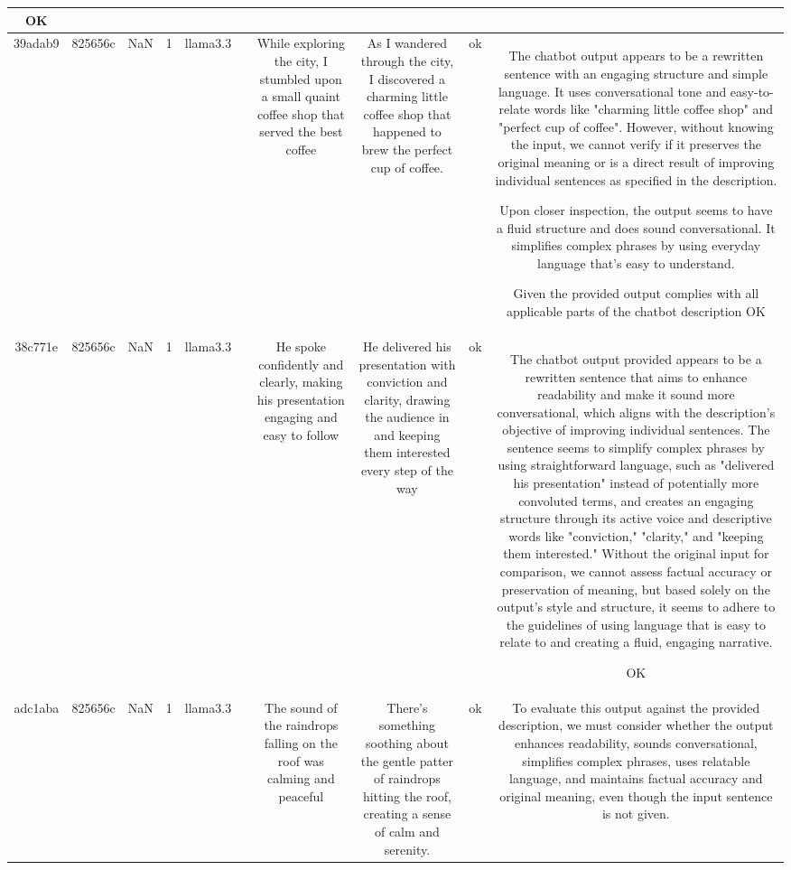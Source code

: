\begin{table}[h!]
\begin{tabular}{|c|c|c|c|c|c|c|c|c|c|}
OK\\
\hline
39adab9 & 825656c & NaN & 1 & llama3.3 &  & While exploring the city, I stumbled upon a small quaint coffee shop that served the best coffee & As I wandered through the city, I discovered a charming little coffee shop that happened to brew the perfect cup of coffee. & ok & The chatbot output appears to be a rewritten sentence with an engaging structure and simple language. It uses conversational tone and easy-to-relate words like "charming little coffee shop" and "perfect cup of coffee". However, without knowing the input, we cannot verify if it preserves the original meaning or is a direct result of improving individual sentences as specified in the description.

Upon closer inspection, the output seems to have a fluid structure and does sound conversational. It simplifies complex phrases by using everyday language that's easy to understand.

Given the provided output complies with all applicable parts of the chatbot description OK\\
\hline
38c771e & 825656c & NaN & 1 & llama3.3 &  & He spoke confidently and clearly, making his presentation engaging and easy to follow & He delivered his presentation with conviction and clarity, drawing the audience in and keeping them interested every step of the way & ok & The chatbot output provided appears to be a rewritten sentence that aims to enhance readability and make it sound more conversational, which aligns with the description's objective of improving individual sentences. The sentence seems to simplify complex phrases by using straightforward language, such as "delivered his presentation" instead of potentially more convoluted terms, and creates an engaging structure through its active voice and descriptive words like "conviction," "clarity," and "keeping them interested." Without the original input for comparison, we cannot assess factual accuracy or preservation of meaning, but based solely on the output's style and structure, it seems to adhere to the guidelines of using language that is easy to relate to and creating a fluid, engaging narrative.

OK\\
\hline
adc1aba & 825656c & NaN & 1 & llama3.3 &  & The sound of the raindrops falling on the roof was calming and peaceful & There's something soothing about the gentle patter of raindrops hitting the roof, creating a sense of calm and serenity. & ok & To evaluate this output against the provided description, we must consider whether the output enhances readability, sounds conversational, simplifies complex phrases, uses relatable language, and maintains factual accuracy and original meaning, even though the input sentence is not given.


\end{tabular}
\end{table}
